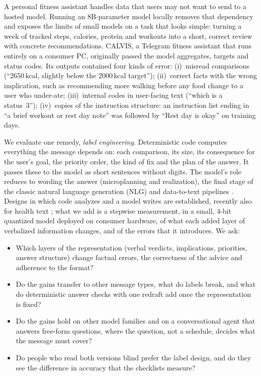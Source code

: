 \documentclass[10pt,twocolumn]{article}
\begin{document}
A personal fitness assistant handles data that users may not want to send to a hosted model. Running an 8B-parameter
model locally removes that dependency and exposes the limits of small models on a task that looks simple: turning a
week of tracked steps, calories, protein and workouts into a short, correct review with concrete recommendations.
CALVIS, a Telegram fitness assistant that runs entirely on a consumer PC, originally passed the model aggregates,
targets and status codes. Its outputs contained four kinds of error:
(i)~misread comparisons (``2650\,kcal, slightly below the 2000\,kcal target'');
(ii)~correct facts with the wrong implication, such as recommending more walking before any food change to a user
who under-ate;
(iii)~internal codes in user-facing text (``which is a status~3'');
(iv)~copies of the instruction structure: an instruction list ending in ``a brief workout or rest day note'' was
followed by ``Rest day is okay'' on training days.

We evaluate one remedy, \emph{label engineering}. Deterministic code computes everything the message depends on:
each comparison, its size, its consequence for the user's goal, the priority order, the kind of fix and the plan of
the answer. It passes these to the model as short sentences without digits. The model's role reduces to wording the
answer (microplanning and realization), the final stage of the classic natural language generation (NLG) and
data-to-text pipelines \citep{reiter2000building,reiter2007architecture}. Designs in which code analyzes and a model
writes are established, recently also for health text \citep{cheng2026thinkfast}; what we add is a stepwise
measurement, in a small, 4-bit quantized model deployed on consumer hardware, of what each added layer of verbalized
information changes, and of the errors that it introduces. We ask:
\begin{itemize}
\item[\textbf{RQ1}] Which layers of the representation (verbal verdicts, implications, priorities, answer structure)
change factual errors, the correctness of the advice and adherence to the format?
\item[\textbf{RQ2}] Do the gains transfer to other message types, what do labels break, and what do deterministic
answer checks with one redraft add once the representation is fixed?
\item[\textbf{RQ3}] Do the gains hold on other model families and on a conversational agent that answers free-form
questions, where the question, not a schedule, decides what the message must cover?
\item[\textbf{RQ4}] Do people who read both versions blind prefer the label design, and do they see the difference in
accuracy that the checklists measure?
\end{itemize}
\end{document}
